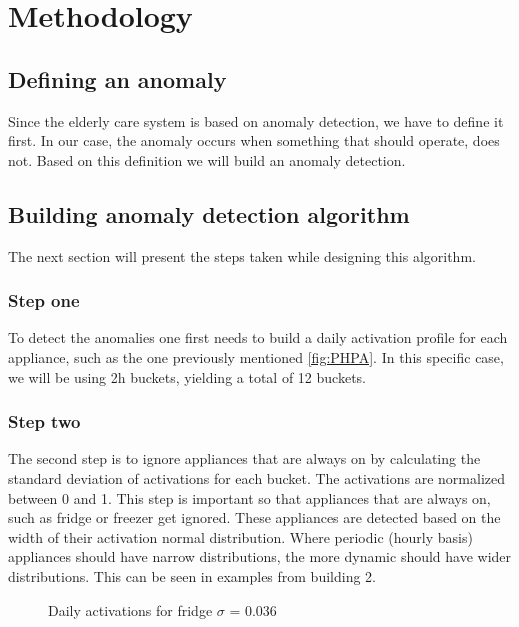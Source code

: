 \section{Methodology}

\subsection{Defining an anomaly}

Since the elderly care system is based on anomaly detection, we have to define it first.
In our case, the anomaly occurs when something that should operate, does not. 
Based on this definition we will build an anomaly detection. 

\subsection{Building anomaly detection algorithm}

The next section will present the steps taken while designing this algorithm.

\subsubsection{Step one}
To detect the anomalies one first needs to build a daily activation profile for each appliance, such as the one previously mentioned \ref{fig:PHPA}.
In this specific case, we will be using 2h buckets, yielding a total of 12 buckets. 

\subsubsection{Step two}
The second step is to ignore appliances that are always on by calculating the standard deviation of activations for each bucket. 
The activations are normalized between 0 and 1. 
This step is important so that appliances that are always on, such as fridge or freezer get ignored. 
These appliances are detected based on the width of their activation normal distribution. 
Where periodic (hourly basis) appliances should have narrow distributions, the more dynamic should have wider distributions.
This can be seen in examples from building 2.

\begin{figure}[H]
    \centering
    \caption{Daily activations for fridge $\sigma$ = 0.036}
    \label{arr:fridge_acts}
\end{figure}

